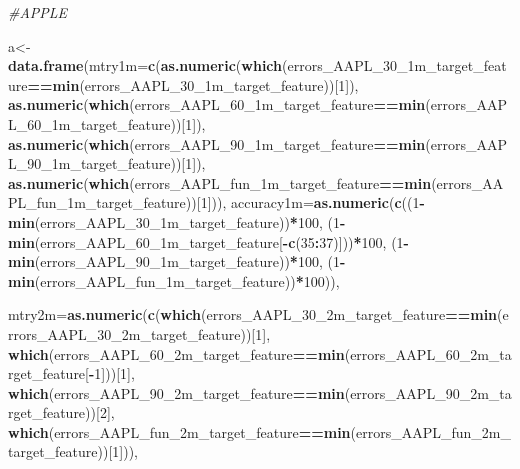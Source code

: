 \documentclass[]{article}
\newenvironment{Shaded}{\begin{snugshade}}{\end{snugshade}}
\newcommand{\KeywordTok}[1]{\textcolor[rgb]{0.13,0.29,0.53}{\textbf{#1}}}
\newcommand{\DataTypeTok}[1]{\textcolor[rgb]{0.13,0.29,0.53}{#1}}
\newcommand{\DecValTok}[1]{\textcolor[rgb]{0.00,0.00,0.81}{#1}}
\newcommand{\CommentTok}[1]{\textcolor[rgb]{0.56,0.35,0.01}{\textit{#1}}}
\newcommand{\OperatorTok}[1]{\textcolor[rgb]{0.81,0.36,0.00}{\textbf{#1}}}
\newcommand{\NormalTok}[1]{#1}
\begin{document}
\begin{Shaded}
\begin{Highlighting}[]
\CommentTok{#APPLE}


\NormalTok{a<-}\KeywordTok{data.frame}\NormalTok{(}\DataTypeTok{mtry1m=}\KeywordTok{c}\NormalTok{(}\KeywordTok{as.numeric}\NormalTok{(}\KeywordTok{which}\NormalTok{(errors_AAPL_30_1m_target_feature}\OperatorTok{==}\KeywordTok{min}\NormalTok{(errors_AAPL_30_1m_target_feature))[}\DecValTok{1}\NormalTok{]),}
                                    \KeywordTok{as.numeric}\NormalTok{(}\KeywordTok{which}\NormalTok{(errors_AAPL_60_1m_target_feature}\OperatorTok{==}\KeywordTok{min}\NormalTok{(errors_AAPL_60_1m_target_feature))[}\DecValTok{1}\NormalTok{]),}
                                   \KeywordTok{as.numeric}\NormalTok{(}\KeywordTok{which}\NormalTok{(errors_AAPL_90_1m_target_feature}\OperatorTok{==}\KeywordTok{min}\NormalTok{(errors_AAPL_90_1m_target_feature))[}\DecValTok{1}\NormalTok{]),}
                                   \KeywordTok{as.numeric}\NormalTok{(}\KeywordTok{which}\NormalTok{(errors_AAPL_fun_1m_target_feature}\OperatorTok{==}\KeywordTok{min}\NormalTok{(errors_AAPL_fun_1m_target_feature))[}\DecValTok{1}\NormalTok{])),}
              \DataTypeTok{accuracy1m=}\KeywordTok{as.numeric}\NormalTok{(}\KeywordTok{c}\NormalTok{((}\DecValTok{1}\OperatorTok{-}\KeywordTok{min}\NormalTok{(errors_AAPL_30_1m_target_feature))}\OperatorTok{*}\DecValTok{100}\NormalTok{,}
\NormalTok{                                    (}\DecValTok{1}\OperatorTok{-}\KeywordTok{min}\NormalTok{(errors_AAPL_60_1m_target_feature[}\OperatorTok{-}\KeywordTok{c}\NormalTok{(}\DecValTok{35}\OperatorTok{:}\DecValTok{37}\NormalTok{)]))}\OperatorTok{*}\DecValTok{100}\NormalTok{,}
\NormalTok{                                    (}\DecValTok{1}\OperatorTok{-}\KeywordTok{min}\NormalTok{(errors_AAPL_90_1m_target_feature))}\OperatorTok{*}\DecValTok{100}\NormalTok{,}
\NormalTok{                                    (}\DecValTok{1}\OperatorTok{-}\KeywordTok{min}\NormalTok{(errors_AAPL_fun_1m_target_feature))}\OperatorTok{*}\DecValTok{100}\NormalTok{)),}
              
              
              \DataTypeTok{mtry2m=}\KeywordTok{as.numeric}\NormalTok{(}\KeywordTok{c}\NormalTok{(}\KeywordTok{which}\NormalTok{(errors_AAPL_30_2m_target_feature}\OperatorTok{==}\KeywordTok{min}\NormalTok{(errors_AAPL_30_2m_target_feature))[}\DecValTok{1}\NormalTok{],}
                                    \KeywordTok{which}\NormalTok{(errors_AAPL_60_2m_target_feature}\OperatorTok{==}\KeywordTok{min}\NormalTok{(errors_AAPL_60_2m_target_feature[}\OperatorTok{-}\DecValTok{1}\NormalTok{]))[}\DecValTok{1}\NormalTok{],}
                                   \KeywordTok{which}\NormalTok{(errors_AAPL_90_2m_target_feature}\OperatorTok{==}\KeywordTok{min}\NormalTok{(errors_AAPL_90_2m_target_feature))[}\DecValTok{2}\NormalTok{],}
                                   \KeywordTok{which}\NormalTok{(errors_AAPL_fun_2m_target_feature}\OperatorTok{==}\KeywordTok{min}\NormalTok{(errors_AAPL_fun_2m_target_feature))[}\DecValTok{1}\NormalTok{])),}
              

\end{Highlighting}
\end{Shaded}
\end{document}
